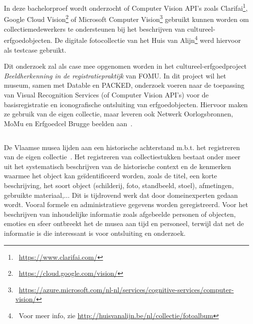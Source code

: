 
\chapter{}
\label{ch:inleiding}

In deze bachelorproef wordt onderzocht of Computer Vision API’s zoals Clarifai\footnote{~\url{https://www.clarifai.com/}}, Google Cloud Vision\footnote{~\url{https://cloud.google.com/vision/}} of Microsoft Computer Vision\footnote{~\url{https://azure.microsoft.com/nl-nl/services/cognitive-services/computer-vision/}} gebruikt kunnen worden om collectiemedewerkers te ondersteunen bij het beschrijven van cultureel-erfgoedobjecten. De digitale fotocollectie van het Huis van Alijn\footnote{~Voor meer info, zie \url{http://huisvanalijn.be/nl/collectie/fotoalbum}} werd hiervoor als testcase gebruikt.

Dit onderzoek zal als case mee opgenomen worden in het cultureel-erfgoedproject \textit{Beeldherkenning in de registratiepraktijk} van FOMU. In dit project wil het museum, samen met Datable en PACKED, onderzoek voeren naar de toepassing van Visual Recognition Services (of Computer Vision API’s) voor de basisregistratie en iconografische ontsluiting van erfgoedobjecten. Hiervoor maken ze gebruik van de eigen collectie, maar leveren ook Netwerk Oorlogsbronnen, MoMu en Erfgoedcel Brugge beelden aan~\autocite{Derveaux2019}.


\section{}
\label{sec:probleemstelling}

De Vlaamse musea lijden aan een historische achterstand m.b.t. het registreren van de eigen collectie~\autocite{Gatz2016}. Het registreren van collectiestukken bestaat onder meer uit het systematisch beschrijven van de historische context en de kenmerken waarmee  het object kan geïdentificeerd worden, zoals de titel, een korte beschrijving, het soort object (schilderij, foto, standbeeld, stoel), afmetingen, gebruikte materiaal,... Dit is tijdrovend werk dat door domeinexperten gedaan wordt. Vooral formele en administratieve gegevens worden geregistreerd. Voor het beschrijven van inhoudelijke informatie zoals afgebeelde personen of objecten, emoties en sfeer ontbreekt het de musea aan tijd en personeel, terwijl dat net de informatie is die interessant is voor ontsluiting en onderzoek.

